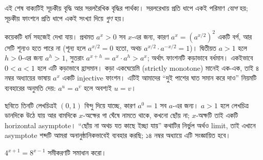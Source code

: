 \documentclass[11pt]{article}
\begin{document}
এই শেষ বাক্যটিই সূচকীয় বৃদ্ধি আর সরলরৈখিক বৃদ্ধির পার্থক্য। সরলরেখায় প্রতি ধাপে
একই পরিমাণ \emph{যোগ} হয়; সূচকীয় ফাংশনে প্রতি ধাপে একই সংখ্যা দিয়ে \emph{গুণ}
হয়।

কয়েকটি ধর্ম সহজেই দেখা যায়। প্রথমত $a^{x} > 0$ সব $x$-এর জন্য, কারণ
$a^{x} = \left( a^{x/2} \right)^{2}$ একটি বর্গ, আর সেটি শূন্যও হতে পারে না
(শূন্য হলে $a^{x/2} = 0$ হতো, অথচ $a^{x/2} \cdot a^{-x/2} = 1$)। দ্বিতীয়ত
$a > 1$ হলে $h > 0$-এর জন্য $a^{h} > 1$, সুতরাং
$a^{x+h} = a^{x} \cdot a^{h} > a^{x}$; অর্থাৎ ফাংশনটি কড়াভাবে বর্ধমান। একইভাবে
$0 < a < 1$ হলে এটি কড়াভাবে হ্রাসমান। কড়া একঘেয়েমি (strictly monotone) মানেই
এক-এক, তাই ৪ নম্বর অধ্যায়ের ভাষায় $a^{x}$ একটি injective ফাংশন। এটিই
আমাদের ``দুই পাশের ঘাত সমান করে দাও'' নিয়মটি ব্যবহারের অনুমতি দেয়:
$a^{u} = a^{v}$ হলে অবশ্যই $u = v$।

\begin{center}
\end{center}

ছবিতে তিনটি লেখচিত্রই $(0,1)$ বিন্দু দিয়ে যাচ্ছে, কারণ $a^{0} = 1$ সব $a$-এর
জন্য। $a > 1$ হলে লেখচিত্র ডানদিকে উঠে যায় আর বামদিকে $x$-অক্ষের গা ঘেঁষে
নামতে থাকে, কখনো ছোঁয় না; $x$-অক্ষটি তাই একটি horizontal asymptote। ``ছোঁয় না
অথচ যত কাছে ইচ্ছা যায়'' কথাটির নির্ভুল অর্থও limit, তাই এখানে asymptote শব্দটি
আমরা অনানুষ্ঠানিকভাবেই ব্যবহার করছি; ১৪ নম্বর অধ্যায়ে এটি সংজ্ঞায়িত হবে।

\begin{example}
$4^{x+1} = 8^{x-1}$ সমীকরণটি সমাধান করো।
\end{example}
\end{document}
